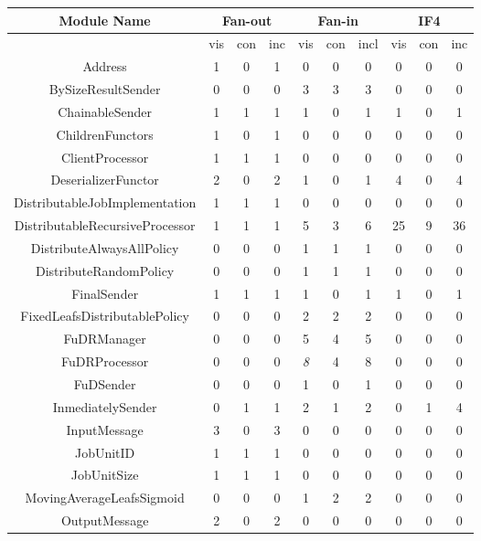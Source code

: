\begin{tabular}{|c|c|c|c|c|c|c|c|c|c|}
        \hline
        Module Name & \multicolumn{3}{|c|}{Fan-out} & \multicolumn{3}{|c|}{Fan-in} & \multicolumn{3}{|c|}{IF4} \\
        \hline 
 &vis &con &inc &vis &con &incl &vis &con &inc \\
 \hline 
 Address & 1 & 0 & 1 & 0 & 0 & 0 & 0 & 0 & 0 \\
 \hline 
 BySizeResultSender & 0 & 0 & 0 & 3 & 3 & 3 & 0 & 0 & 0 \\
 \hline 
 ChainableSender & 1 & 1 & 1 & 1 & 0 & 1 & 1 & 0 & 1 \\
 \hline 
 ChildrenFunctors & 1 & 0 & 1 & 0 & 0 & 0 & 0 & 0 & 0 \\
 \hline 
 ClientProcessor & 1 & 1 & 1 & 0 & 0 & 0 & 0 & 0 & 0 \\
 \hline 
 DeserializerFunctor & 2 & 0 & 2 & 1 & 0 & 1 & 4 & 0 & 4 \\
 \hline 
 DistributableJobImplementation & 1 & 1 & 1 & 0 & 0 & 0 & 0 & 0 & 0 \\
 \hline 
 DistributableRecursiveProcessor & 1 & 1 & 1 & 5 & 3 & 6 & 25 & 9 & 36 \\
 \hline 
 DistributeAlwaysAllPolicy & 0 & 0 & 0 & 1 & 1 & 1 & 0 & 0 & 0 \\
 \hline 
 DistributeRandomPolicy & 0 & 0 & 0 & 1 & 1 & 1 & 0 & 0 & 0 \\
 \hline 
 FinalSender & 1 & 1 & 1 & 1 & 0 & 1 & 1 & 0 & 1 \\
 \hline 
 FixedLeafsDistributablePolicy & 0 & 0 & 0 & 2 & 2 & 2 & 0 & 0 & 0 \\
 \hline 
 FuDRManager & 0 & 0 & 0 & 5 & 4 & 5 & 0 & 0 & 0 \\
 \hline 
 FuDRProcessor & 0 & 0 & 0 &\emph{ 8}
 & 4 & 8 & 0 & 0 & 0 \\
 \hline 
 FuDSender & 0 & 0 & 0 & 1 & 0 & 1 & 0 & 0 & 0 \\
 \hline 
 InmediatelySender & 0 & 1 & 1 & 2 & 1 & 2 & 0 & 1 & 4 \\
 \hline 
 InputMessage & 3 & 0 & 3 & 0 & 0 & 0 & 0 & 0 & 0 \\
 \hline 
 JobUnitID & 1 & 1 & 1 & 0 & 0 & 0 & 0 & 0 & 0 \\
 \hline 
 JobUnitSize & 1 & 1 & 1 & 0 & 0 & 0 & 0 & 0 & 0 \\
 \hline 
 MovingAverageLeafsSigmoid & 0 & 0 & 0 & 1 & 2 & 2 & 0 & 0 & 0 \\
 \hline 
 OutputMessage & 2 & 0 & 2 & 0 & 0 & 0 & 0 & 0 & 0 \\

\end{tabular}

